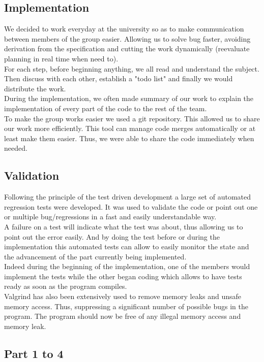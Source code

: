 \subsection{Implementation}
We decided to work everyday at the university so as to make communication
between members of the group easier. Allowing us to solve bug faster, avoiding
derivation from the specification and cutting the work dynamically (reevaluate
planning in real time when need to).\\
For each step, before beginning anything, we all read and understand the
subject. Then discuss with each other, establish a "todo list" and finally we
would distribute the work.\\ 
During the implementation, we often made summary of our work to explain the
implementation of every part of the code to the rest of the team.\\
To make the group works easier we used a git repository. This allowed us to
share our work more efficiently. This tool can manage code merges automatically
or at least make them easier. Thus, we were able to share the code immediately
when needed.\\

\subsection{Validation}
Following the principle of the test driven development a large set of automated
regression tests were developed. It was used to validate the code or point out
one or multiple bug/regressions in a fast and easily understandable way. \\
A failure on a test will indicate what the test was about, thus allowing us to
point out the error easily. And by doing the test before or during the
implementation this automated tests can allow to easily monitor the state and
the advancement of the part currently being implemented.\\
Indeed during the beginning of the implementation, one of the members would
implement the tests while the other began coding which allows to have tests
ready as soon as the program compiles.\\
Valgrind has also been extensively used to remove memory leaks and unsafe
memory access. Thus, suppressing a significant number of possible bugs in the
program. The program should now be free of any illegal memory access and memory
leak.

\subsection{Part 1 to 4}

